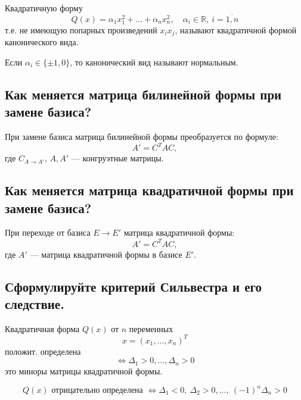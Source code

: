 \begin{definition}
    Квадратичную форму
    \[
        Q(x) = \alpha_1 x_1^2 + \ldots + \alpha_n x_n^2,\quad \alpha_i \in \mathbb{R},\ i = \overline{1, n}
    \]
    т.е. не имеющую попарных произведений $x_i x_j$, называют квадратичной формой канонического вида.
    
    Если $\alpha_i \in \{\pm 1, 0\}$, то канонический вид называют нормальным.
\end{definition}


\subsection{Как меняется матрица билинейной формы при замене базиса?}

\begin{theorem}
    При замене базиса матрица билинейной формы преобразуется по формуле:
    \[
        A' = C^TAC,
    \]
    где $C_{A \to A'}$, $A, A'$ --- конгруэтные матрицы.
\end{theorem}


\subsection{Как меняется матрица квадратичной формы при замене базиса?}
 
\begin{theorem}
    При переходе от базиса $E \to E'$ матрица квадратичной формы:
    \[
        A' = C^TAC,
    \]
    где $A'$ --- матрица квадратичной формы в базисе $E'$.
\end{theorem}


\subsection{Сформулируйте критерий Сильвестра и его следствие.}

\begin{theorem}
    Квадратичная форма $Q(x)$ от $n$ переменных
    \[
        x = (x_1, \ldots, x_n)^T
    \]
    положит. определена
    \[
        \Longleftrightarrow
        \Delta_1 > 0,\ldots,\Delta_n > 0
    \]
    это миноры матрицы квадратичной формы.
\end{theorem}

\begin{theorem}[Следствие]
    \[
        Q(x) \text{ отрицательно определена }
        \Longleftrightarrow
        \Delta_1 < 0,\ \Delta_2 > 0,\ldots,\ (-1)^n \Delta_n > 0
    \]
\end{theorem}


